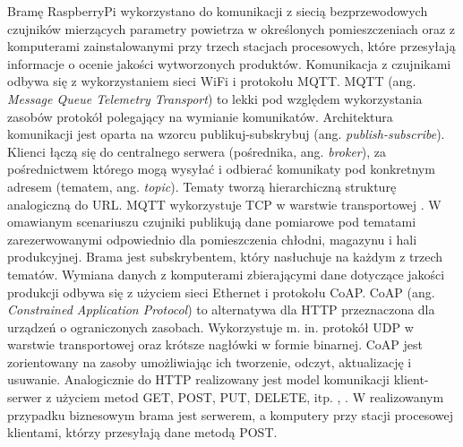 \documentclass[a4paper, 12pt, twoside]{article}
\begin{document}
Bramę RaspberryPi wykorzystano do komunikacji z siecią bezprzewodowych czujników
mierzących parametry powietrza w określonych pomieszczeniach oraz z
komputerami zainstalowanymi przy trzech stacjach procesowych, które
przesyłają informacje o ocenie jakości wytworzonych produktów.
Komunikacja z czujnikami odbywa się z wykorzystaniem sieci WiFi i protokołu
MQTT. MQTT (ang. \emph{Message Queue Telemetry Transport}) to lekki pod względem wykorzystania zasobów
protokół polegający na wymianie komunikatów. Architektura komunikacji
jest oparta na wzorcu publikuj-subskrybuj (ang. \emph{publish-subscribe}).
Klienci łączą się do centralnego serwera (pośrednika, ang. \emph{broker}), za pośrednictwem
którego mogą wysyłać i odbierać komunikaty pod konkretnym adresem (tematem, ang. \emph{topic}).
Tematy tworzą hierarchiczną strukturę analogiczną do URL. MQTT
wykorzystuje TCP w warstwie transportowej \cite{iot-hype-to-reality}. W omawianym
scenariuszu czujniki publikują dane pomiarowe pod tematami zarezerwowanymi
odpowiednio dla pomieszczenia chłodni, magazynu i hali produkcyjnej. Brama
jest subskrybentem, który nasłuchuje na każdym z trzech tematów. Wymiana danych
z komputerami zbierającymi dane dotyczące jakości produkcji odbywa się
z użyciem sieci Ethernet i protokołu CoAP. CoAP (ang. \emph{Constrained Application Protocol})
to alternatywa dla HTTP przeznaczona dla urządzeń o ograniczonych zasobach.
Wykorzystuje m. in. protokół UDP w warstwie transportowej oraz krótsze nagłówki w formie binarnej.
CoAP jest zorientowany na zasoby umożliwiając ich tworzenie, odczyt, aktualizację
i usuwanie. Analogicznie do HTTP realizowany jest model komunikacji
klient-serwer z użyciem metod GET, POST, PUT, DELETE, itp. \cite{intro-to-iot}, \cite{iot-hype-to-reality}.
W realizowanym przypadku biznesowym brama jest serwerem, a komputery
przy stacji procesowej klientami, którzy przesyłają dane metodą POST.
\end{document}
